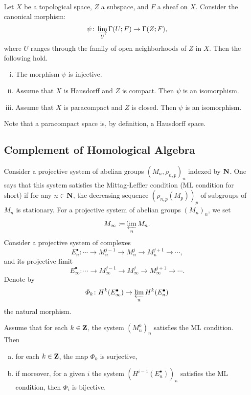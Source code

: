 \begin{Proposition+}[{\cite[Proposition 2.5.1]{KS90}}]\label{prop:ks2.5.1}
  Let \(X\) be a topological space, 
  \(Z\) a subspace, and \(F\) a sheaf on \(X\). 
  Consider the canonical morphism:
  \[
    \psi\colon \indlim[U]\Gamma(U;F)
    \to 
    \Gamma(Z;F),
  \]
  where \(U\) ranges through the family of 
  open neighborhoods of \(Z\) in \(X\). 
  Then the following hold.
  \begin{enumerate}[(i)]
    \item The morphism \(\psi\) is injective. 
    \item Assume that \(X\) is Hausdorff and \(Z\) is compact. 
    Then \(\psi\) is an isomorphism.
    \item Assume that \(X\) is paracompact and \(Z\) is closed. 
    Then \(\psi\) is an isomorphism.
  \end{enumerate}
\end{Proposition+}

Note that a paracompact space 
is, by definition, a Hausdorff space. 

\subsection{Complement of Homological Algebra}\label{ssec:ML}

Consider a projective system of abelian groups \(
  \left(M_n,\rho_{n,p}\right)_n
\) indexed by \(\nn\). 
One says that this system satisfies 
the Mittag-Leffler condition (ML condition for short) 
if for any \(n\in\nn\), the decreasing sequence \(
  (\rho_{n,p}(M_p))_p
\) of subgroups of \(M_n\) is stationary.
For a projective system of abelian groups \((M_{n})_n\), 
we set \[
  M_{\infty}\coloneqq \prolim[n]M_n.
\]
Consider a projective system of complexes
\begin{equation}
  E_n^{\bullet}\colon 
  \cdots\to M_{n}^{j-1}\to M_{n}^{j}\to M_{n}^{j+1}\to\cdots,
\end{equation}
and its projective limit
\begin{equation}
  E_{\infty}^{\bullet}\colon 
  \cdots
  \to M_{\infty}^{j-1}
  \to M_{\infty}^{j}
  \to M_{\infty}^{j+1}
  \to\cdots.
\end{equation}
Denote by 
\begin{equation}
  \varPhi_{k}\colon H^{k}(E_{\infty}^{\bullet})\to \prolim[n]H^{k}(E_{n}^{\bullet})
\end{equation}
the natural morphism.

\begin{Proposition+}[{\cite[Proposition 1.12.4]{KS90}}]\label{prop:ks1.12.4}
  Assume that for each \(k\in\zz\), 
  the system \(\left(M_{n}^{k}\right)_{n}\) satisfies 
  the ML condition. 
  Then
  \begin{enumerate}[(a)]
    \item for each \(k\in \zz\), the map \(\varPhi_k\) is surjective,
    \item if moreover, for a given \(i\) the system \(\left(H^{i-1}(E_{n}^{\bullet})\right)_{n}\) satisfies the ML condition, then \(\varPhi_i\) is bijective.
  \end{enumerate} 
\end{Proposition+}


